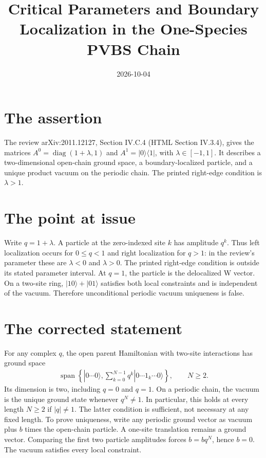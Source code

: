 \documentclass{article}
\title{Critical Parameters and Boundary Localization in the One-Species PVBS Chain}
\author{}
\date{2026-10-04}
\begin{document}
\maketitle
{}

\section{The assertion}
The review arXiv:2011.12127, Section IV.C.4 (HTML Section IV.3.4), gives the
matrices $A^0=\operatorname{diag}(1+\lambda,1)$ and
$A^1=|0\rangle\langle1|$, with $\lambda\in[-1,1]$.
It describes a two-dimensional open-chain ground space, a boundary-localized
particle, and a unique product vacuum on the periodic chain. The printed right-edge
condition is $\lambda>1$.

\section{The point at issue}
Write $q=1+\lambda$. A particle at the zero-indexed site $k$ has amplitude
$q^k$. Thus left localization occurs for $0\le q<1$ and right localization
for $q>1$: in the review's parameter these are $\lambda<0$ and $\lambda>0$.
The printed right-edge condition is outside its stated parameter interval.
At $q=1$, the particle is the delocalized W vector. On a two-site ring,
$|10\rangle+|01\rangle$ satisfies both local constraints and is independent
of the vacuum. Therefore unconditional periodic vacuum uniqueness is false.

\section{The corrected statement}
For any complex $q$, the open parent Hamiltonian with two-site interactions
has ground space
\begin{align}
    \operatorname{span}\left\{|0\cdots0\rangle,
    \sum_{k=0}^{N-1}q^k|0\cdots1_k\cdots0\rangle\right\},\qquad N\ge2.
    \label{eq:pvbs_gap_open_space}
\end{align}
Its dimension is two, including $q=0$ and $q=1$.
On a periodic chain, the vacuum is the unique ground state whenever $q^N\ne1$.
In particular, this holds at every length $N\ge2$ if $|q|\ne1$.
The latter condition is sufficient, not necessary at any fixed length.
To prove uniqueness, write any periodic ground vector as vacuum plus $b$ times
the open-chain particle. A one-site translation remains a ground vector.
Comparing the first two particle amplitudes forces $b=bq^N$, hence $b=0$.
The vacuum satisfies every local constraint.
\end{document}
